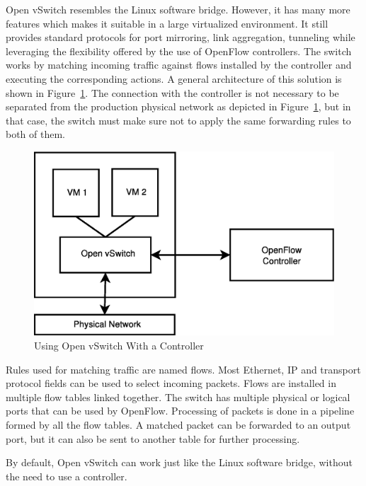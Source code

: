 Open vSwitch resembles the Linux software bridge. However, it has many more features which makes it
suitable in a large virtualized environment. It still provides standard protocols for port mirroring,
link aggregation, tunneling while leveraging the flexibility offered by the use of OpenFlow controllers.
The switch works by matching incoming traffic against flows installed by the controller and executing
the corresponding actions. A general architecture of this solution is shown in Figure~\ref{fig:genarch}.
The connection with the controller is not necessary to be separated from the production physical network
as depicted in Figure~\ref{fig:genarch}, but in that case, the switch must make sure not to apply the
same forwarding rules to both of them.

\begin{figure}
\begin{center}
\includegraphics[scale=0.5]{src/img/ovs-arch.eps}
\end{center}
\caption{Using Open vSwitch With a Controller}
\label{fig:genarch}
\end{figure}

Rules used for matching traffic are named flows. Most Ethernet, IP and transport protocol fields can be used to
select incoming packets. Flows are installed in multiple flow tables linked together.
The switch has multiple physical or logical ports that can be used by OpenFlow. Processing of packets is done
in a pipeline formed by all the flow tables. A matched packet can be forwarded to an output port, but it can
also be sent to another table for further processing.

By default, Open vSwitch can work just like the Linux software bridge, without the need to use a controller.


